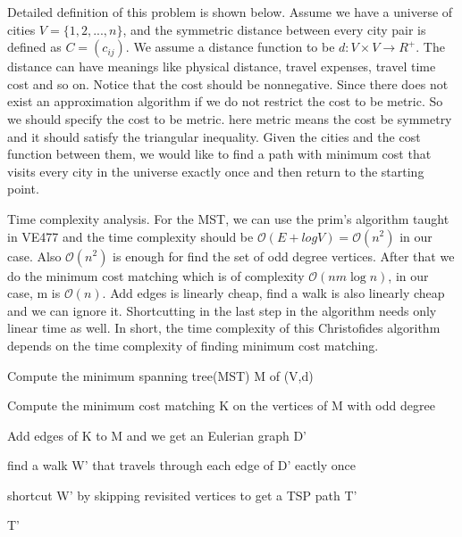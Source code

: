 \documentclass[catalog.tex]{subfiles}
\begin{document}
Detailed definition of this problem is shown below. Assume we have a universe of cities $V = \{1, 2, ..., n\}$, and the symmetric distance between every city pair is defined as $C = (c_{ij})$. We assume a distance function to be $d: V \times V \to R^+$. The distance can have meanings like physical distance, travel expenses, travel time cost and so on. Notice that the cost should be nonnegative. Since there does not exist an approximation algorithm if we do not restrict the cost to be metric\cite{vg441}. So we should specify the cost to be metric. here metric means the cost be symmetry and it should satisfy the triangular inequality. Given the cities and the cost function between them, we would like to find a path with minimum cost that visits every city in the universe exactly once and then return to the starting point. \newline

Time complexity analysis. For the MST, we can use the prim's algorithm taught in VE477 and the time complexity should be $\mathcal{O}(E + logV) = \mathcal{O} (n^2)$ in our case\cite{ve477}. Also $\mathcal{O}(n^2)$ is enough for find the set of odd degree vertices. After that we do the minimum cost matching which is of complexity $\mathcal{O}(nm \log n)$, in our case, m is $\mathcal{O}(n)$. Add edges is linearly cheap, find a walk is also linearly cheap and we can ignore it. Shortcutting in the last step in the algorithm needs only linear time as well. In short, the time complexity of this Christofides algorithm depends on the time complexity of finding minimum cost matching.

\begin{Algorithm}[Christofides\label{alg:\currfilebase}]
	\BlankLine
	Compute the minimum spanning tree(MST) M of (V,d)

	Compute the minimum cost matching K on the vertices of M with odd degree

	Add edges of K to M and we get an Eulerian graph D'

	find a walk W' that travels through each edge of D' eactly once

	shortcut W' by skipping revisited vertices to get a TSP path T'

	\Ret T'

\end{Algorithm}
\end{document}
